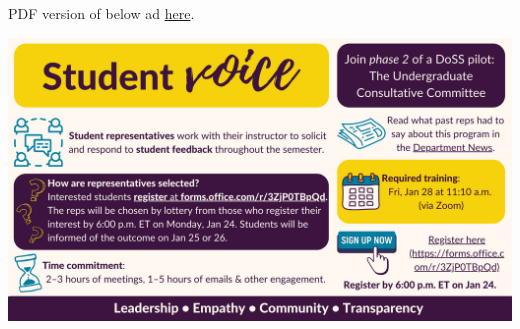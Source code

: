 \documentclass[
  openany]{book}
\begin{document}
PDF version of below ad \href{https://sta303-bolton.github.io/sta303-w22-courseguide/other-files/student-rep-ad-w22.pdf}{here}.

\includegraphics{images/Student Rep Ad (Winter 2022).png}

  
\end{document}
